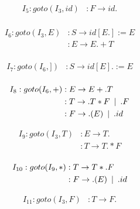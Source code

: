 \documentclass{article}
\newcommand\tab[1][5pt]{\hspace*{#1}}
\newcommand\sep{\tab | \tab }
\begin{document}
\begin{figure}[h!]
\begin{multicols}{2}
\begin{equation*}
\begin{aligned}
I_5 : goto(I_3,id) &: F \rightarrow id.  \\
\end{aligned}
\end{equation*}

\begin{equation*}
\begin{aligned}
I_6 : goto(I_3,E) &: S \rightarrow id[E.] :=E  \\
&: E \rightarrow E.+T \\
\end{aligned}
\end{equation*}

\begin{equation*}
\begin{aligned}
I_7 : goto(I_6,]) &: S \rightarrow id[E]. :=E  \\
\end{aligned}
\end{equation*}

\begin{equation*}
\begin{aligned}
I_8 : goto(I_6,+) &: E \rightarrow E+.T  \\
&: T \rightarrow .T*F \tab | \tab  .F \\
&: F \rightarrow .(E) \sep .id \\
\end{aligned}
\end{equation*}


\begin{equation*}
\begin{aligned}
I_9 : goto(I_3,T) &: E \rightarrow T.  \\
&: T \rightarrow T.*F  \\
\end{aligned}
\end{equation*}

\begin{equation*}
\begin{aligned}
I_{10} : goto(I_9,*) &: T \rightarrow T*.F  \\
&: F \rightarrow .(E) \sep .id
\end{aligned}
\end{equation*}


\begin{equation*}
\begin{aligned}
I_{11} : goto(I_3,F) &: T \rightarrow F.  \\
\end{aligned}
\end{equation*}



\end{multicols}
\end{figure}
\end{document}

